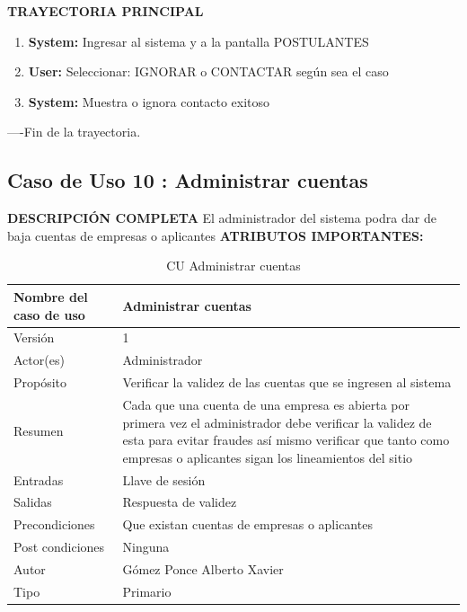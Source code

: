 \textbf{TRAYECTORIA PRINCIPAL}			
\begin{enumerate}			
\item \textbf{	System: 	}	Ingresar al sistema y a la pantalla POSTULANTES
\item \textbf{	User: 	}	Seleccionar: IGNORAR o CONTACTAR  según sea el caso
\item \textbf{	System: 	}	Muestra o ignora contacto exitoso
			
\end{enumerate}			
----Fin de la trayectoria.			


\newpage			
\subsection{Caso de Uso 	10	: Administrar cuentas	}
		\textbf{DESCRIPCIÓN COMPLETA}	
		\newline 	
		El administrador del sistema podra dar de baja cuentas de empresas o aplicantes 	
\newline	\newline	\textbf{ATRIBUTOS IMPORTANTES:}	
\begin{table}[h]			
        \begin{center}			
\begin{tabular}{|l|p{11cm}|} \hline			
Nombre del caso de uso	&	Administrar cuentas 	\\ \hline
Versión	&	1	\\ \hline
Actor(es)	&	Administrador	\\ \hline
Propósito	&	Verificar la validez de las cuentas que se ingresen al sistema	\\ \hline
Resumen	&	Cada que una cuenta de una empresa es abierta por primera vez el administrador debe verificar la validez de esta para evitar fraudes así mismo verificar que tanto como empresas o aplicantes sigan los lineamientos del sitio	\\ \hline
Entradas	&	Llave de sesión			\\ \hline
Salidas	&	Respuesta de validez	\\ \hline
Precondiciones	&	Que existan cuentas de empresas o aplicantes	\\ \hline
Post condiciones	&	Ninguna	\\ \hline
Autor	&	Gómez Ponce Alberto Xavier	\\ \hline
Tipo	&	Primario 	\\ \hline
\end{tabular}			
        \caption	{	CU Administrar cuentas	}
        \label	{tabla	10	}
        \end{center}			
\end{table}			
